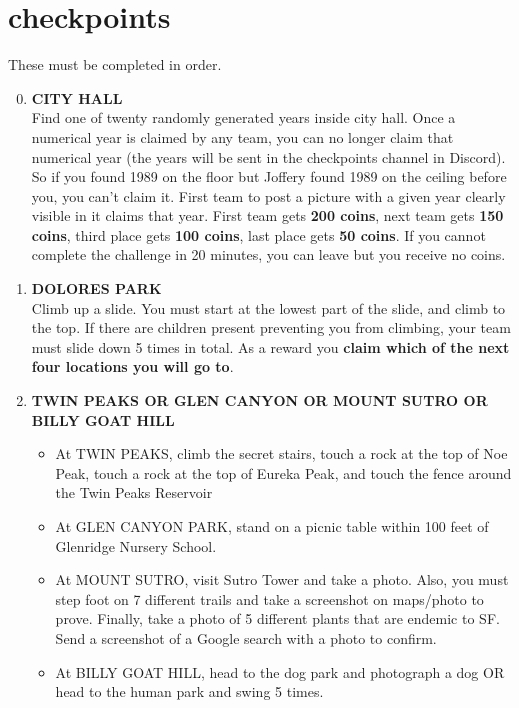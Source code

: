 \documentclass{article}
\begin{document}
\section{checkpoints}
These must be completed in order.

\begin{enumerate}
    \setcounter{enumi}{-1}

    \item \textbf{CITY HALL} \\
        Find one of twenty randomly generated years inside city hall. Once a numerical year is claimed by any team, you can no longer claim that numerical year (the years will be sent in the checkpoints channel in Discord). So if you found 1989 on the floor but Joffery found 1989 on the ceiling before you, you can't claim it. First team to post a picture with a given year clearly visible in it claims that year. First team gets \textbf{200 coins}, next team gets \textbf{150 coins}, third place gets \textbf{100 coins}, last place gets \textbf{50 coins}. If you cannot complete the challenge in 20 minutes, you can leave but you receive no coins.

    \item \textbf{DOLORES PARK} \\
        Climb up a slide. You must start at the lowest part of the slide, and climb to the top. If there are children present preventing you from climbing, your team must slide down 5 times in total. As a reward you \textbf{claim which of the next four locations you will go to}.

    \item \textbf{TWIN PEAKS OR GLEN CANYON OR MOUNT SUTRO OR BILLY GOAT HILL} \\ 
    \begin{itemize}
        \item At TWIN PEAKS, climb the secret stairs, touch a rock at the top of Noe Peak, touch a rock at the top of Eureka Peak, and touch the fence around the Twin Peaks Reservoir
        \item At GLEN CANYON PARK, stand on a picnic table within 100 feet of Glenridge Nursery School.
        \item At MOUNT SUTRO, visit Sutro Tower and take a photo. Also, you must step foot on 7 different trails and take a screenshot on maps/photo to prove. Finally, take a photo of 5 different plants that are endemic to SF. Send a screenshot of a Google search with a photo to confirm.
        \item At BILLY GOAT HILL, head to the dog park and photograph a dog OR head to the human park and swing 5 times. 
    \end{itemize}


\end{enumerate}
\end{document}
